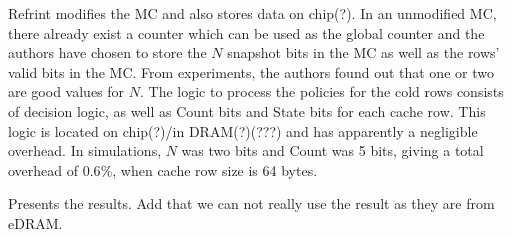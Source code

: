 
Refrint modifies the MC and also stores data on chip(?). In an unmodified MC, there already exist a counter which can be used as the global counter and the authors have chosen to store the $N$ snapshot bits in the MC as well as the rows' valid bits in the MC. From experiments, the authors found out that one or two are good values for $N$. The logic to process the policies for the cold rows consists of decision logic, as well as Count bits and State bits for each cache row. This logic is located on chip(?)/in DRAM(?)(???) and has apparently a negligible overhead. In simulations, $N$ was two bits and Count was 5 bits, giving a total overhead of $0.6\%$, when cache row size is 64 bytes.

Presents the results. Add that we can not really use the result as they are from eDRAM.

